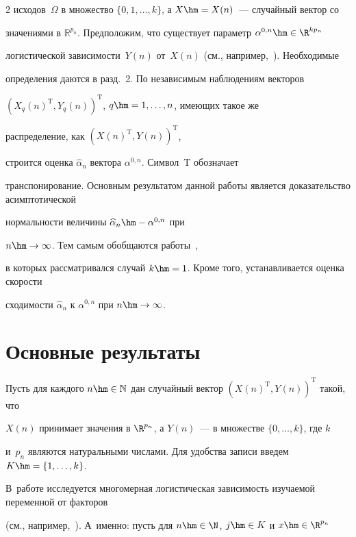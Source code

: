 \begin{multicols}{2}
исходов~$\Omega$ в множество $\{0,1,\ldots,k\}$, а $X\hm=X(n)$~--- случайный вектор со 


значениями в $\mathbb{R}^{p_n}$. Предположим, что существует параметр $\alpha^{0,n}\hm\in\R^{kp_n}$ 


логистической зависимости~$Y(n)$ от~$X(n)$ (см., например,~\cite{gee}). Необходимые 


определения даются в разд.~2. По независимым наблюдениям векторов 


$(X_q(n)^{\mathrm{T}},Y_q(n))^{\mathrm{T}}$, $q\hm=1,\ldots,n$, имеющих такое же 


распределение, как $(X(n)^{\mathrm{T}},Y(n))^{\mathrm{T}}$, 


строится оценка $\widehat{\alpha}_n$ вектора $\alpha^{0,n}$. Символ~T обозначает 


транспонирование. Основным результатом данной работы является доказательство асимптотической 


нормальности величины $\widehat{\alpha}_n\hm-\alpha^{0,n}$ при 


$n\hm\rightarrow\infty$. Тем самым обобщаются работы~\cite{gee, MLELR}, 


в которых рас\-смат\-ри\-вал\-ся случай $k\hm=1$. Кроме того, устанавливается оценка скорости 


сходимости $\widehat{\alpha}_n$ к $\alpha^{0,n}$ при $n\hm\rightarrow\infty$.








\section{Основные результаты}








Пусть для каждого $n\hm\in\mathbb{N}$ дан случайный вектор $(X(n)^{\mathrm{T}},Y(n))^{\mathrm{T}}$ такой, что 


$X(n)$ принимает значения в $\R^{p_n}$, а $Y(n)$~--- в множестве $\{0,\ldots,k\}$, где $k$ 


и~$p_n$ являются натуральными числами. Для удобства записи введем $K\hm=\{1,\ldots,k\}$. 


В~работе исследуется многомерная логистическая зависимость изучаемой переменной от факторов 


(см., например,~\cite{Anderson}). А~именно: пусть для $n\hm\in\N$, $j\hm\in K$ и $x\hm\in\R^{p_n}$ 



\end{multicols}
